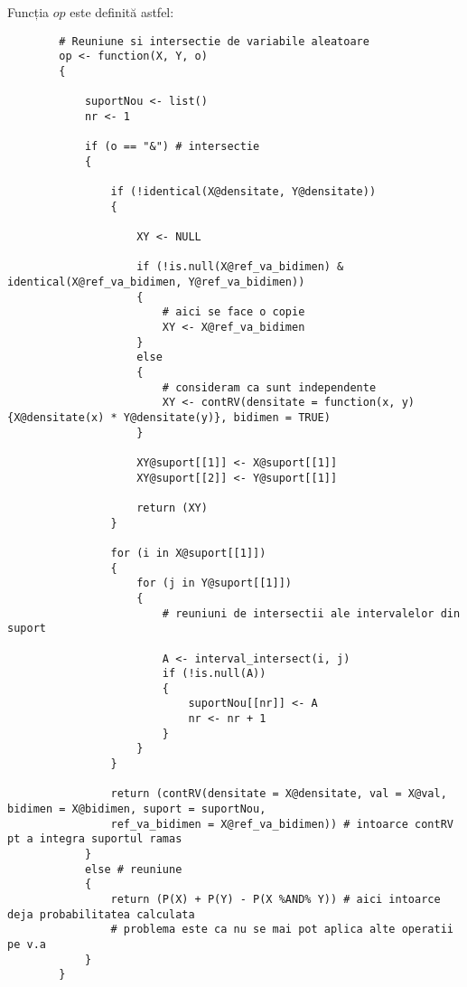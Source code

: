 \documentclass[12pt]{article}
\begin{document}
	Funcția $op$ este definită astfel:
	\begin{lstlisting}
		# Reuniune si intersectie de variabile aleatoare
		op <- function(X, Y, o)
		{
			
			suportNou <- list()
			nr <- 1
			
			if (o == "&") # intersectie
			{
				
				if (!identical(X@densitate, Y@densitate))
				{
					
					XY <- NULL
					
					if (!is.null(X@ref_va_bidimen) & identical(X@ref_va_bidimen, Y@ref_va_bidimen))
					{
						# aici se face o copie
						XY <- X@ref_va_bidimen
					}
					else
					{
						# consideram ca sunt independente
						XY <- contRV(densitate = function(x, y) {X@densitate(x) * Y@densitate(y)}, bidimen = TRUE)
					}
					
					XY@suport[[1]] <- X@suport[[1]]
					XY@suport[[2]] <- Y@suport[[1]]
					
					return (XY)
				}
				
				for (i in X@suport[[1]])
				{
					for (j in Y@suport[[1]])
					{
						# reuniuni de intersectii ale intervalelor din suport
						
						A <- interval_intersect(i, j)
						if (!is.null(A))
						{
							suportNou[[nr]] <- A
							nr <- nr + 1
						}
					}
				}
				
				return (contRV(densitate = X@densitate, val = X@val, bidimen = X@bidimen, suport = suportNou,
				ref_va_bidimen = X@ref_va_bidimen)) # intoarce contRV pt a integra suportul ramas
			}
			else # reuniune
			{
				return (P(X) + P(Y) - P(X %AND% Y)) # aici intoarce deja probabilitatea calculata
				# problema este ca nu se mai pot aplica alte operatii pe v.a
			}
		}
	\end{lstlisting}
\end{document}
